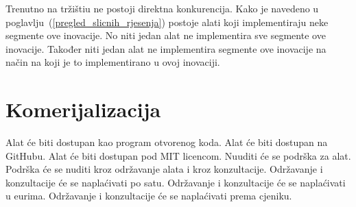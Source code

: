 Trenutno na tržištiu ne postoji direktna konkurencija. Kako je 
navedeno u poglavlju~(\ref{pregled_slicnih_rjesenja}) postoje alati koji
implementiraju neke segmente ove inovacije. No niti jedan alat ne implementira
sve segmente ove inovacije. Također niti jedan alat ne implementira segmente
ove inovacije na način na koji je to implementirano u ovoj inovaciji. 

\section{Komerijalizacija} \label{komerijalizacija}

Alat će biti dostupan kao program otvorenog koda. Alat će biti dostupan na
GitHubu. Alat će biti dostupan pod MIT licencom. Nuuditi će se podrška za
alat. Podrška će se nuditi kroz održavanje alata i kroz konzultacije. Održavanje
i konzultacije će se naplaćivati po satu. Održavanje i konzultacije će se
naplaćivati u eurima. Održavanje i konzultacije će se naplaćivati prema
cjeniku. 
